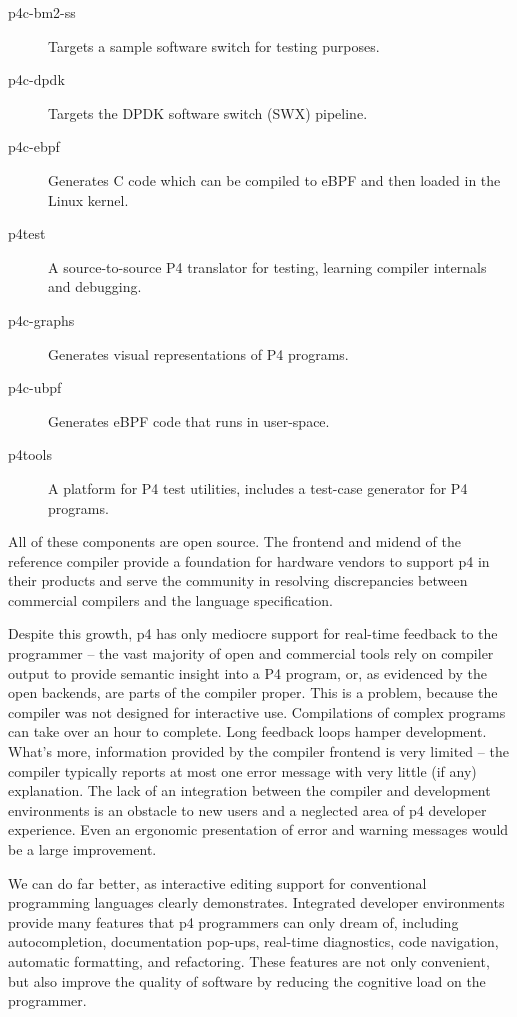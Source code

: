 \begin{description}
	\item[p4c-bm2-ss] Targets a sample software switch for testing purposes.
	\item[p4c-dpdk] Targets the DPDK software switch (SWX) pipeline\cite{dpdkDPDKRelease}.
	\item[p4c-ebpf] Generates C code which can be compiled to eBPF
		and then loaded in the Linux kernel.
	\item[p4test] A source-to-source P4 translator for testing, learning compiler
		internals and debugging.
	\item[p4c-graphs] Generates visual representations of P4 programs.
	\item[p4c-ubpf] Generates eBPF code that runs in user-space.
	\item[p4tools] A platform for P4 test utilities, includes a test-case
		generator for P4 programs.
\end{description}

All of these components are open source. The frontend and mid\-end of the
reference compiler provide a foundation for hardware vendors to support
\acrshort{p4} in their products and serve the community in resolving
discrepancies between commercial compilers and the language specification.

Despite this growth, \acrshort{p4} has only mediocre support for real-time
feedback to the programmer -- the vast majority of open and commercial tools
rely on compiler output to provide semantic insight into a P4
program\cite{p4insight}, or, as evidenced by the open backends, are parts of the
compiler proper. This is a problem, because the compiler was not designed for
interactive use. Compilations of complex programs can take over an hour to
complete. Long feedback loops hamper development. What's more, information
provided by the compiler frontend is very limited -- the compiler typically
reports at most one error message with very little (if any) explanation. The
lack of an integration between the compiler and development environments is an
obstacle to new users and a neglected area of \acrshort{p4} developer
experience. Even an ergonomic presentation of error and warning messages would
be a large improvement.

We can do far better, as interactive editing support for conventional
programming languages clearly demonstrates. Integrated developer environments
provide many features that \acrshort{p4} programmers can only dream of,
including autocompletion, documentation pop-ups, real-time diagnostics, code
navigation, automatic formatting, and refactoring. These features are not only
convenient, but also improve the quality of software by reducing the cognitive
load on the programmer.

